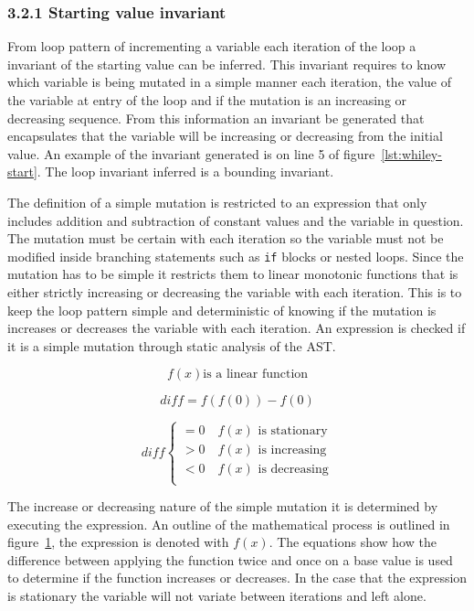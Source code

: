 \documentclass[11pt, a4paper, twoside, openright]{report}
\newcommand{\code}[1]{\texttt{#1}}
\begin{document}
\subsubsection*{3.2.1 Starting value invariant}

From loop pattern of incrementing a variable each iteration of the loop
a invariant of the starting value can be inferred.
This invariant requires to know which variable is being
mutated in a simple manner each iteration,
the value of the variable at entry of the loop and if the mutation is an
increasing or decreasing sequence.
From this information an invariant be generated that encapsulates that the
variable will be increasing or decreasing from the initial value.
An example of the invariant generated is on line 5 of
figure~\ref{lst:whiley-start}.
The loop invariant inferred is a bounding invariant.

The definition of a simple mutation is restricted to an expression that only
includes addition and subtraction of constant values and the variable in question.
The mutation must be certain with each iteration so the variable must not be
modified inside branching statements such as \code{if} blocks or nested loops.
Since the mutation has to be simple it restricts them to linear monotonic
functions that is either strictly increasing or decreasing the variable with each iteration.
This is to keep the loop pattern simple and deterministic of knowing if the
mutation is increases or decreases the variable with each iteration.
An expression is checked if it is a simple mutation through static analysis of
the AST.

\begin{figure}
    $$f(x) \text{is a linear function}$$

    $$diff = f(f(0)) - f(0)$$

    \[
        diff \begin{cases}
            = 0 \quad f(x) \text{ is stationary}\\
            > 0 \quad f(x) \text{ is increasing}\\
            < 0 \quad f(x) \text{ is decreasing}\\
        \end{cases}
    \]
\label{math:simple-mutation}
\end{figure}

The increase or decreasing nature of the simple mutation it is determined by
executing the expression. An outline of the mathematical process is outlined
in figure~\ref{math:simple-mutation}, the expression is denoted with $f(x)$.
The equations show how the difference between applying the function twice and once on a base value is used to
determine if the function increases or decreases.
In the case that the expression is stationary the variable will not variate
between iterations and left alone.
\end{document}
